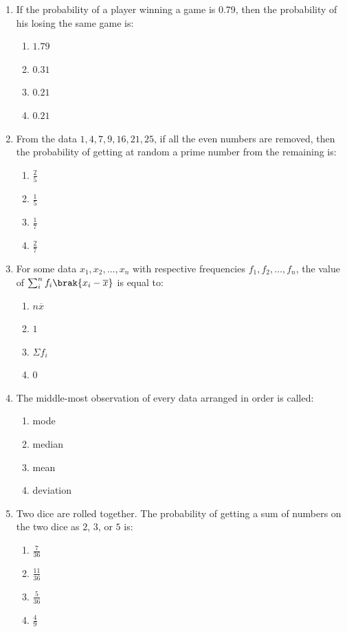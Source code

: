 
\begin{enumerate}

\item If the probability of a player winning a game is 0.79, then the probability of his losing the same game is:
\begin{enumerate}    
    \item $1.79$
    \item $0.31$
    \item $0.21	$                                                           
    \item $0.21$
\end{enumerate}

\item From the data $1, 4, 7, 9, 16, 21, 25$, if all the even numbers are removed, then the probability of getting at random a prime number from the remaining is:
	\begin{enumerate}
\item $\frac{2}{5}$
    \item $\frac{1}{5}$
    \item $\frac{1}{7}$
    \item $\frac{2}{7}$
	\end{enumerate}

\item For some data $x_{1}, x_{2}, \dots, x_{n}$ with respective frequencies $f_{1}, f_{2}, \dots, f_{n}$, the value of $\sum_{i}^{n}f_{i} \brak{x_{i} - \overline{x}}$ is equal to:
	\begin{enumerate}    
\item $n \overline{x}$
    \item $1$
    \item $\Sigma f_{i}$
    \item $0$
	\end{enumerate}

\item The middle-most observation of every data arranged in order is called:
	\begin{enumerate}    
\item mode
    \item median
    \item mean
    \item deviation
\end{enumerate}
\newpage
\item Two dice are rolled together. The probability of getting a sum of numbers on the two dice as $2$, $3$, or $5$ is:
	\begin{enumerate}    
\item $\frac{7}{36}$
    \item $\frac{11}{36}$
    \item $\frac{5}{36}$
    \item $\frac{4}{9}$
	\end{enumerate}


\end{enumerate}
